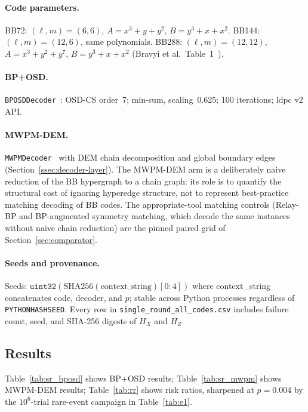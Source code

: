 \documentclass[11pt,a4paper]{article}
\begin{document}
\paragraph{Code parameters.}
BB72: $(\ell,m)=(6,6)$, $A=x^3+y+y^2$, $B=y^3+x+x^2$.
BB144: $(\ell,m)=(12,6)$, same polynomials.
BB288: $(\ell,m)=(12,12)$, $A=x^3+y^2+y^7$, $B=y^3+x+x^2$
(Bravyi et al.\ Table~1~\cite{Bravyi2024}).

\paragraph{BP+OSD.}
\texttt{BPOSDDecoder}~\cite{AlDaajeh2026emulator,ldpcPackage}:
OSD-CS order~7; min-sum, scaling~0.625; 100 iterations; ldpc v2 API.

\paragraph{MWPM-DEM.}
\texttt{MWPMDecoder}~\cite{AlDaajeh2026emulator,Higgott2023}
with DEM chain decomposition and global boundary edges
(Section~\ref{ssec:decoder-layer}).
The MWPM-DEM arm is a deliberately naive reduction of the BB
hypergraph to a chain graph: its role is to quantify the structural
cost of ignoring hyperedge structure, not to represent best-practice
matching decoding of BB codes. The appropriate-tool matching controls
(Relay-BP and BP-augmented symmetry matching, which decode the same
instances without naive chain reduction) are the pinned paired grid of
Section~\ref{sec:comparator}.

\paragraph{Seeds and provenance.}
Seeds: $\texttt{uint32}(\mathrm{SHA256}(\mathrm{context\_string})[0{:}4])$
where context\_string concatenates code, decoder, and $p$;
stable across Python processes regardless of \texttt{PYTHONHASHSEED}.
Every row in \texttt{single\_round\_all\_codes.csv} includes
failure count, seed, and SHA-256 digests of $H_X$ and $H_Z$.

\subsection{Results}

Table~\ref{tab:sr_bposd} shows BP+OSD results; Table~\ref{tab:sr_mwpm}
shows MWPM-DEM results; Table~\ref{tab:rr} shows risk ratios, sharpened
at $p=0.004$ by the $10^{6}$-trial rare-event campaign in
Table~\ref{tab:e1}.
\end{document}
